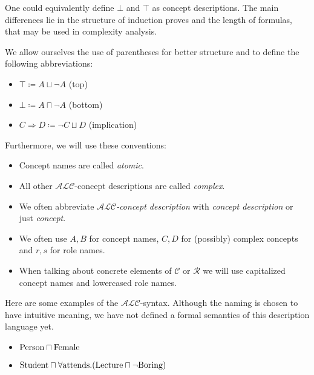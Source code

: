 \begin{note}
	One could equivalently define $\bot$ and $\top$ as concept descriptions.
	The main differences lie in the structure of induction proves and the length of formulas, that may be used in complexity analysis.
\end{note}

\begin{notation}
	We allow ourselves the use of parentheses for better structure and to define the following abbreviations:
	\begin{itemize}
		\item $ \top \coloneqq A \sqcup \neg A $ (top)
		\item $ \bot \coloneqq A \sqcap \neg A $ (bottom)
		\item $ C \Rightarrow D \coloneqq \neg C \sqcup D $ (implication)
	\end{itemize}
	Furthermore, we will use these conventions:
	\begin{itemize}
		\item Concept names are called \textit{atomic}.
		\item All other $\mathcal{ALC}$-concept descriptions are called \textit{complex}.
		\item We often abbreviate \textit{$\mathcal{ALC}$-concept description} with \textit{concept description} or just \textit{concept}.
		\item We often use $A, B$ for concept names, $C, D$ for (possibly) complex concepts and $r, s$ for role names.
		\item When talking about concrete elements of $\mathscr{C}$ or $\mathscr{R}$ we will use capitalized concept names and lowercased role names.
	\end{itemize}
\end{notation}

\begin{example}
	Here are some examples of the $\mathcal{ALC}$-syntax.
	Although the naming is chosen to have intuitive meaning, we have not defined a formal semantics of this description language yet.
	\begin{itemize}
		\item $ \var{Person} \sqcap \var{Female}$
		\item $ \var{Student} \sqcap \forall \var{attends}.(\var{Lecture}\sqcap \neg \var{Boring})$
	\end{itemize}
\end{example}
